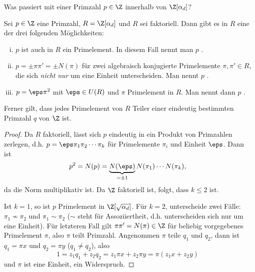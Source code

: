 Was passiert mit einer Primzahl $p \in \Z$ innerhalb von $\Z[\alpha_d]$?

\begin{st} \label{4.12}
	Sei $p \in \Z$ eine Primzahl, $R = \Z[\alpha_d]$ und $R$ sei faktoriell.
	Dann gibt es in $R$ eine der drei folgenden Möglichkeiten:
	\begin{enumerate}[(i)]
		\item
			$p$ ist auch in $R$ ein Primelement.
			In diesem Fall nennt man $p$ .
		\item
			$p = \pm \pi \pi' = \pm N(\pi)$ für zwei algebraisch konjugierte Primelemente $\pi, \pi' \in R$, die sich \emph{nicht nur} um eine Einheit unterscheiden.
			Man nennt $p$ .
		\item
			$p = \eps \pi^2$ mit $\eps \in U(R)$ und $\pi$ Primelement in $R$.
			Man nennt dann $p$ .
	\end{enumerate}
	Ferner gilt, dass jedes Primelement von $R$ Teiler einer eindeutig bestimmten Primzahl $q$ von $\Z$ ist.
	\begin{proof}
		Da $R$ faktoriell, lässt sich $p$ eindeutig in ein Produkt von Primzahlen zerlegen, d.h. $p = \eps \pi_1 \pi_2 \dotsb \pi_k$ für Primelemente $\pi_i$ und Einheit $\eps$.
		Dann ist
		\[
			p^2 = N(p) = \underbrace{N(\eps)}_{=\pm 1} N(\pi_1) \dotsb N(\pi_k),
		\]
		da die Norm multiplikativ ist.
		Da $\Z$ faktoriell ist, folgt, dass $k \le 2$ ist.

		Ist $k = 1$, so ist $p$ Primelement in $\Z[\sqrt{\alpha_d}]$.
		Für $k = 2$, unterscheide zwei Fälle: $\pi_1 \not\sim \pi_2$ und $\pi_1 \sim \pi_2$ ($\sim$ steht für Assoziiertheit, d.h. unterscheiden sich nur um eine Einheit).
		Für letzteren Fall gilt $\pi \pi' = N(\pi) \in \Z$ für beliebig vorgegebenes Primelement $\pi$, also $\pi$ teilt Primzahl.
		Angenommen $\pi$ teile $q_1$ und $q_2$, dann ist $q_1 = \pi x$ und $q_2 = \pi y$ ($q_1 \neq q_2$), also
		\[
			1 = z_1 q_1 + z_2 q_2
			= z_1 \pi x + z_2 \pi y
			= \pi(z_1 x + z_2 y)
		\]
		und $\pi$ ist eine Einheit, ein Widerspruch.
	\end{proof}
\end{st}


